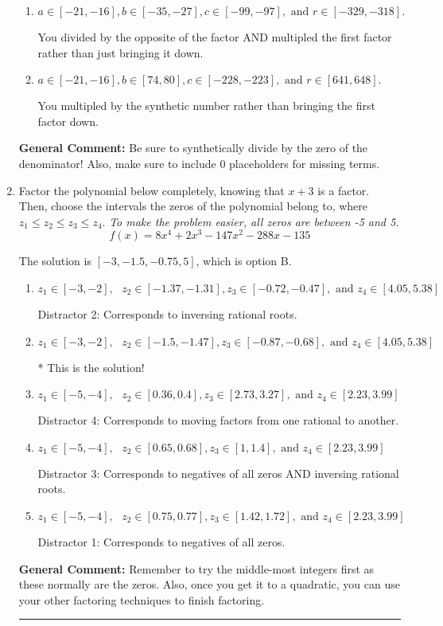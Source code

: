 \documentclass{extbook}[14pt]
\newcommand{\litem}[1]{\item #1

\rule{\textwidth}{0.4pt}}
\begin{document}
\begin{enumerate}
{\begin{enumerate}[label=\Alph*.]
* This is the solution!
\item \( a \in [-21, -16], b \in [-35, -27], c \in [-99, -97], \text{ and } r \in [-329, -318]. \)

 You divided by the opposite of the factor AND multipled the first factor rather than just bringing it down.
\item \( a \in [-21, -16], b \in [74, 80], c \in [-228, -223], \text{ and } r \in [641, 648]. \)

 You multipled by the synthetic number rather than bringing the first factor down.
\end{enumerate}

\textbf{General Comment:} Be sure to synthetically divide by the zero of the denominator! Also, make sure to include 0 placeholders for missing terms.
}
\litem{
Factor the polynomial below completely, knowing that $x+3$ is a factor. Then, choose the intervals the zeros of the polynomial belong to, where $z_1 \leq z_2 \leq z_3 \leq z_4$. \textit{To make the problem easier, all zeros are between -5 and 5.}
\[ f(x) = 8x^{4} +2 x^{3} -147 x^{2} -288 x -135 \]

The solution is \( [-3, -1.5, -0.75, 5] \), which is option B.\begin{enumerate}[label=\Alph*.]
\item \( z_1 \in [-3, -2], \text{   }  z_2 \in [-1.37, -1.31], z_3 \in [-0.72, -0.47], \text{   and   } z_4 \in [4.05, 5.38] \)

 Distractor 2: Corresponds to inversing rational roots.
\item \( z_1 \in [-3, -2], \text{   }  z_2 \in [-1.5, -1.47], z_3 \in [-0.87, -0.68], \text{   and   } z_4 \in [4.05, 5.38] \)

* This is the solution!
\item \( z_1 \in [-5, -4], \text{   }  z_2 \in [0.36, 0.4], z_3 \in [2.73, 3.27], \text{   and   } z_4 \in [2.23, 3.99] \)

 Distractor 4: Corresponds to moving factors from one rational to another.
\item \( z_1 \in [-5, -4], \text{   }  z_2 \in [0.65, 0.68], z_3 \in [1, 1.4], \text{   and   } z_4 \in [2.23, 3.99] \)

 Distractor 3: Corresponds to negatives of all zeros AND inversing rational roots.
\item \( z_1 \in [-5, -4], \text{   }  z_2 \in [0.75, 0.77], z_3 \in [1.42, 1.72], \text{   and   } z_4 \in [2.23, 3.99] \)

 Distractor 1: Corresponds to negatives of all zeros.
\end{enumerate}

\textbf{General Comment:} Remember to try the middle-most integers first as these normally are the zeros. Also, once you get it to a quadratic, you can use your other factoring techniques to finish factoring.
}
\end{enumerate}
\end{document}
